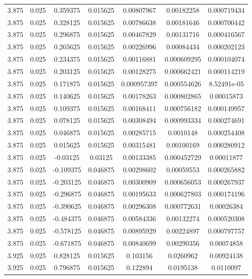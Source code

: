 \begin{flushleft}
\begin{longtable}{ccccccc}
3.875 & 0.025 & 0.359375 & 0.015625 & 0.00807967 & 0.00182258 & 0.000719434  \\ 
3.875 & 0.025 & 0.328125 & 0.015625 & 0.00786638 & 0.00181646 & 0.000700442  \\ 
3.875 & 0.025 & 0.296875 & 0.015625 & 0.00467829 & 0.00131716 & 0.000416567  \\ 
3.875 & 0.025 & 0.265625 & 0.015625 & 0.00226996 & 0.00084434 & 0.000202123  \\ 
3.875 & 0.025 & 0.234375 & 0.015625 & 0.00116881 & 0.000609295 & 0.000104074  \\ 
3.875 & 0.025 & 0.203125 & 0.015625 & 0.00128275 & 0.000662421 & 0.000114219  \\ 
3.875 & 0.025 & 0.171875 & 0.015625 & 0.000957397 & 0.000554626 & 8.52491e-05  \\ 
3.875 & 0.025 & 0.140625 & 0.015625 & 0.00178263 & 0.000802865 & 0.00015873  \\ 
3.875 & 0.025 & 0.109375 & 0.015625 & 0.00168411 & 0.000756182 & 0.000149957  \\ 
3.875 & 0.025 & 0.078125 & 0.015625 & 0.00308494 & 0.000993334 & 0.000274691  \\ 
3.875 & 0.025 & 0.046875 & 0.015625 & 0.00285715 & 0.0010148 & 0.000254408  \\ 
3.875 & 0.025 & 0.015625 & 0.015625 & 0.00315481 & 0.00100169 & 0.000280912  \\ 
3.875 & 0.025 & -0.03125 & 0.03125 & 0.00133385 & 0.000452729 & 0.00011877  \\ 
3.875 & 0.025 & -0.109375 & 0.046875 & 0.00298602 & 0.00059553 & 0.000265882  \\ 
3.875 & 0.025 & -0.203125 & 0.046875 & 0.00300909 & 0.000656053 & 0.000267937  \\ 
3.875 & 0.025 & -0.296875 & 0.046875 & 0.00195633 & 0.000627803 & 0.000174196  \\ 
3.875 & 0.025 & -0.390625 & 0.046875 & 0.00296308 & 0.000772631 & 0.00026384  \\ 
3.875 & 0.025 & -0.484375 & 0.046875 & 0.00584336 & 0.00132274 & 0.000520308  \\ 
3.875 & 0.025 & -0.578125 & 0.046875 & 0.00895929 & 0.00224897 & 0.000797757  \\ 
3.875 & 0.025 & -0.671875 & 0.046875 & 0.00840699 & 0.00290356 & 0.00074858  \\ 
3.925 & 0.025 & 0.828125 & 0.015625 & 0.103156 & 0.0260962 & 0.00924138  \\ 
3.925 & 0.025 & 0.796875 & 0.015625 & 0.122894 & 0.0195138 & 0.0110097  \\ 

\end{longtable}
\end{flushleft}
